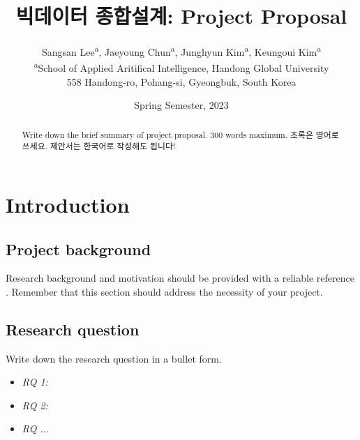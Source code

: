 \documentclass[11pt]{article}
\begin{document}
           

    \title{빅데이터 종합설계: Project Proposal}          
    \author{Sangsan Lee\textsuperscript{a},
        Jaeyoung Chun\textsuperscript{a},
        Junghyun Kim\textsuperscript{a},
        Keungoui Kim\textsuperscript{a}\\
    {\small \textsuperscript{a}School of Applied Aritifical Intelligence, Handong Global University}\\
    {\small 558 Handong-ro, Pohang-si, Gyeongbuk, South Korea}\\
        }

    \date{Spring Semester, 2023}      

 
    \maketitle                 
 
    \begin{abstract}
        Write down the brief summary of project proposal.
        300 words maximum. 초록은 영어로 쓰세요. 제안서는
        한국어로 작성해도 됩니다!
    \end{abstract}

    \tableofcontents
    \newpage
    
    \section{Introduction} 
    \subsection{Project background}
    Research background and motivation should be provided
    with a reliable reference \citep{Kim2018f, Kim2022}.    
    Remember that this section should address the 
    necessity of your project. 
    
    \subsection{Research question}
    Write down the research question in a bullet form.

    \begin{itemize}
        \item \emph{RQ 1: ~~}
        \item \emph{RQ 2: ~~}
        \item \emph{RQ ...}
    \end{itemize}
\end{document}
